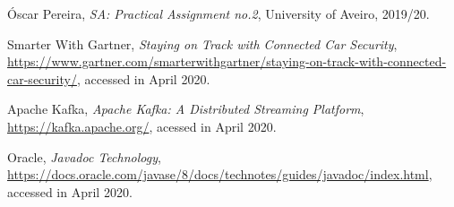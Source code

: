 \documentclass[12pt]{article}
\begin{document}
\begin{thebibliography}{9} %
  

    Óscar Pereira,
    \textit{SA: Practical Assignment no.2},
    University of Aveiro,
    2019/20.
  
    Smarter With Gartner,
    \textit{Staying on Track with Connected Car Security},
    \url{https://www.gartner.com/smarterwithgartner/staying-on-track-with-connected-car-security/},
    accessed in April 2020.

    Apache Kafka,
    \textit{Apache Kafka: A Distributed Streaming Platform},
    \url{https://kafka.apache.org/},
    acessed in April 2020.

    Oracle,
    \textit{Javadoc Technology},
    \url{https://docs.oracle.com/javase/8/docs/technotes/guides/javadoc/index.html},
    accessed in April 2020.


    
 

\end{thebibliography}

\clearpage
\end{document}
